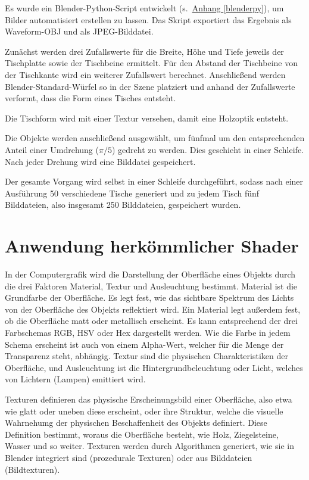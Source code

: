 Es wurde ein Blender-Python-Script entwickelt (s.~\hyperref[blenderpy]{Anhang \ref{blenderpy}}), um Bilder automatisiert erstellen zu lassen. Das Skript exportiert das Ergebnis als Waveform-OBJ und als JPEG-Bilddatei.

Zunächst werden drei Zufallswerte für die Breite, Höhe und Tiefe jeweils der Tischplatte sowie der Tischbeine ermittelt. Für den Abstand der Tischbeine von der Tischkante wird ein weiterer Zufallswert berechnet. Anschließend werden Blender-Standard-Würfel so in der Szene platziert und anhand der Zufallswerte verformt, dass die Form eines Tisches entsteht.

Die Tischform wird mit einer Textur versehen, damit eine Holzoptik entsteht.

Die Objekte werden anschließend ausgewählt, um fünfmal um den entsprechenden Anteil einer Umdrehung ($\pi/5$) gedreht zu werden. Dies geschieht in einer Schleife. Nach jeder Drehung wird eine Bilddatei gespeichert.

Der gesamte Vorgang wird selbst in einer Schleife durchgeführt, sodass nach einer Ausführung 50 verschiedene Tische generiert und zu jedem Tisch fünf Bilddateien, also insgesamt 250 Bilddateien, gespeichert wurden.


\section{Anwendung herkömmlicher Shader}
\label{sec:shader}
In der Computergrafik wird die Darstellung der Oberfläche eines Objekts durch die drei Faktoren Material, Textur und Ausleuchtung bestimmt. Material ist die Grundfarbe der Oberfläche. Es legt fest, wie das sichtbare Spektrum des Lichts von der Oberfläche des Objekts reflektiert wird. Ein Material legt außerdem fest, ob die Oberfläche matt oder metallisch erscheint. Es kann entsprechend der drei Farbschemas RGB, HSV oder Hex dargestellt werden. Wie die Farbe in jedem Schema erscheint ist auch von einem Alpha-Wert, welcher für die Menge der Transparenz steht, abhängig. Textur sind die physischen Charakteristiken der Oberfläche, und Ausleuchtung ist die Hintergrundbeleuchtung oder Licht, welches von Lichtern (Lampen) emittiert wird. \cite{blain2020blender}

Texturen definieren das physische Erscheinungsbild einer Oberfläche, also etwa wie glatt oder uneben diese erscheint, oder ihre Struktur, welche die visuelle Wahrnehumg der physischen Beschaffenheit des Objekts definiert. Diese Definition bestimmt, woraus die Oberfläche besteht, wie Holz, Ziegelsteine, Wasser und so weiter. Texturen werden durch Algorithmen generiert, wie sie in Blender integriert sind (prozedurale Texturen) oder aus Bilddateien (Bildtexturen). \cite{blain2020blender}

